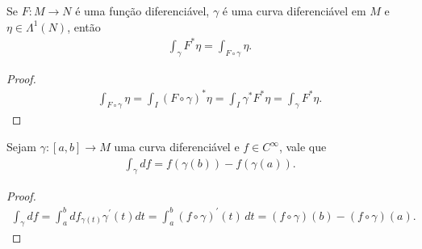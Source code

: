 \begin{proposition}
  Se $F:M\to N$ é uma função diferenciável, $\gamma$ é uma curva diferenciável em $M$ e $\eta\in\Lambda^{1}(N)$, então
  \begin{align*}
    \int_{\gamma}F^{\ast}\eta=\int_{F\circ\gamma}\eta.
  \end{align*}
\end{proposition}
\begin{proof} 
  \begin{align*}
    \int_{F\circ\gamma}\eta=\int_{I}(F\circ \gamma)^{\ast}\eta=\int_{I}\gamma^{\ast}F^{\ast}\eta=\int_{\gamma}F^{\ast}\eta.
  \end{align*}
\end{proof}
\begin{proposition}
  Sejam $\gamma:[a,b]\to M$ uma curva diferenciável e $f\in C^{\infty}$, vale que
  \begin{align*}
    \int_{\gamma}df=f(\gamma(b))-f(\gamma(a)).
  \end{align*}
\end{proposition}
\begin{proof} 
  \begin{align*}
    \int_{\gamma}df=\int_{a}^{b}df_{\gamma(t)}\gamma^{\prime}(t)dt=\int_{a}^{b}(f\circ\gamma)^{\prime}(t)\,dt=(f\circ\gamma)(b)-(f\circ\gamma)(a).
  \end{align*}
\end{proof}

